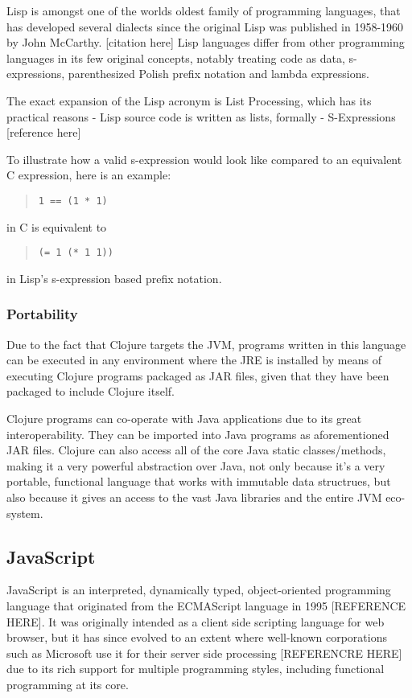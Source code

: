 Lisp is amongst one of the worlds oldest family of programming languages, that has developed several dialects since the original Lisp was published in 1958-1960 by John McCarthy. [citation here]
Lisp languages differ from other programming languages in its few original concepts, notably treating code as data, s-expressions, parenthesized Polish prefix notation and lambda expressions.

The exact expansion of the Lisp acronym is List Processing, which has its practical reasons - Lisp source code is written as lists, formally - S-Expressions [reference here]

To illustrate how a valid s-expression would look like compared to an equivalent C expression, here is an example:

\begin{quote}
\begin{verbatim}
1 == (1 * 1)
\end{verbatim}
\end{quote}
in C is equivalent to

\begin{quote}
\begin{verbatim}
(= 1 (* 1 1))
\end{verbatim}
\end{quote}
in Lisp's s-expression based prefix notation.

\subsubsection{Portability}
Due to the fact that Clojure targets the JVM, programs written in this language can be executed in any environment where the JRE is installed by means of executing Clojure programs packaged as JAR files, given that they have been packaged to include Clojure itself.  

Clojure programs can co-operate with Java applications due to its great interoperability. They can be imported into Java programs as aforementioned JAR files.
Clojure can also access all of the core Java static classes/methods, making it a very powerful abstraction over Java, not only because it's a very portable, functional language that works with immutable data structrues, but also because it gives an access to the vast Java libraries and the entire JVM eco-system.

\subsection{JavaScript}
JavaScript is an interpreted, dynamically typed, object-oriented programming language that originated from the ECMAScript language in 1995 [REFERENCE HERE]. It was originally intended as a client side scripting language for web browser, but it has since evolved to an extent where well-known corporations such as Microsoft use it for their server side processing [REFERENCRE HERE] due to its rich support for multiple programming styles, including functional programming at its core.

